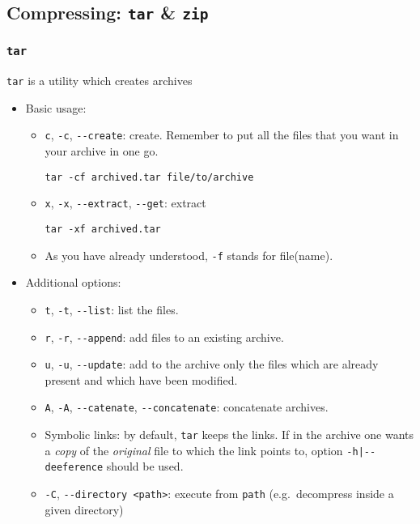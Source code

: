 \documentclass[a4paper,12pt,%
              final%
              ]{article}
\begin{document}
\subsection{Compressing: \texttt{tar} \& \texttt{zip}}
\subsubsection{\texttt{tar}}
\texttt{tar} is a utility which creates archives
\begin{itemize}
  \item Basic usage:
    \begin{itemize}
      \item \verb|c|, \verb|-c|, \verb|--create|: create. Remember to put all the files that you want in your archive in one go.
\begin{verbatim}
tar -cf archived.tar file/to/archive
\end{verbatim}
      \item \verb|x|, \verb|-x|, \verb|--extract|, \verb|--get|: extract
\begin{verbatim}
tar -xf archived.tar
\end{verbatim}
      \item As you have already understood, \verb|-f| stands for file(name).
    \end{itemize}
  \item Additional options:
    \begin{itemize}
      \item \verb|t|, \verb|-t|, \verb|--list|: list the files.
      \item \verb|r|, \verb|-r|, \verb|--append|: add files to an existing archive.
      \item \verb|u|, \verb|-u|, \verb|--update|: add to the archive only the files which are already present and which have been modified.
      \item \verb|A|, \verb|-A|, \verb|--catenate|, \verb|--concatenate|: concatenate archives.
      \item Symbolic links: by default, \texttt{tar} keeps the links. If in the archive one wants a \emph{copy} of the \emph{original} file to which the link points to, option \verb!-h|--deeference! should be used.
      \item \verb|-C|, \verb|--directory <path>|: execute from \verb|path| (e.g.\ decompress inside a given directory)

\end{itemize}
\end{itemize}
\end{document}
